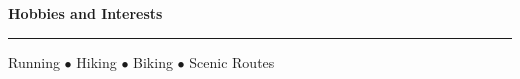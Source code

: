 \documentclass[12pt]{article}
\begin{document}
\begin{comment}
  TODO:
  -Macro command for courses list.
  -Push macros into other file (lsResume.sty)
  -Projects:
    >

      \subsection*{Graph-Based Image Segmentation}
  \subsection*{SVD Image Compression}
  \subsection*{Facial Recognition with Eigenfaces}
  \subsection*{Applications of PageRank Algorithm}
  \subsection*{Drazin Inverse for Social Network Link Prediction}
  \subsection*{Jacobi, Gauss-Seidel, and Successive Over-Relaxation for Solving Linear Systems}
  \subsection*{Linked Lists}
  \subsection*{Binary Search Trees}
  \subsection*{K-D Trees for K-Nearest Neighbors}
  \subsection*{Breadth First Search and Six Degrees of Kevin Bacon}
  \subsection*{Random Speech Generation with Markov Chains}
  \subsection*{Simplex Method}
\end{comment}

\textbf{Hobbies and Interests}
\smallskip
\hrule
  \begin{center}
  Running 
  $\bullet$ Hiking
  $\bullet$ Biking
  $\bullet$ Scenic Routes
  \end{center}
\end{document}
